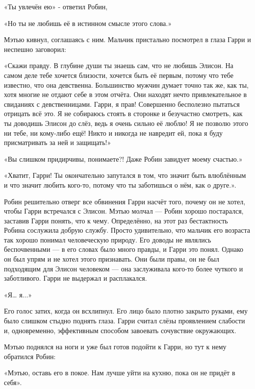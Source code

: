 \documentclass[a4paper,12pt]{book}
\begin{document}
\par
«Ты увлечён ею» - ответил Робин,
\par
«Но ты не любишь её в истинном смысле этого слова.»
\par
Мэтью кивнул, соглашаясь с ним. Мальчик пристально посмотрел в глаза Гарри и неспешно заговорил:
\par
«Скажи правду. В глубине души ты знаешь сам, что не любишь Элисон. На самом деле тебе хочется близости, хочется быть её первым, потому что тебе известно, что она девственна. Большинство мужчин думает точно так же, как ты, хотя многие не отдают себе в этом отчёта. Они находят нечто привлекательное в свиданиях с девственницами. Гарри, я прав! Совершенно бесполезно пытаться отрицать всё это. Я не собираюсь стоять в сторонке и безучастно смотреть, как ты доводишь Элисон до слёз, ведь я очень сильно её люблю! Я не позволю этого ни тебе, ни кому-либо ещё! Никто и никогда не навредит ей, пока я буду присматривать за ней и защищать!»
\par
«Вы слишком придирчивы, понимаете?! Даже Робин завидует моему счастью.»
\par
«Хватит, Гарри! Ты окончательно запутался в том, что значит быть влюблённым и что значит любить кого-то, потому что ты заботишься о нём, как о друге.».
\par
Робин решительно отверг все обвинения Гарри насчёт того, почему он не хотел, чтобы Гарри встречался с Элисон. Мэтью молчал — Робин хорошо постарался, заставив Гарри понять, что к чему. Определённо, на этот раз бестактность Робина сослужила добрую службу. Просто удивительно, что мальчик его возраста так хорошо понимал человеческую природу. Его доводы не являлись беспочвенными — в его словах было много правды, и Гарри это понял. Однако он был упрям и не хотел этого признавать. Они были правы, он не был подходящим для Элисон человеком — она заслуживала кого-то более чуткого и заботливого. Гарри не выдержал и расплакался.
\par
«Я… я...»
\par
Его голос затих, когда он всхлипнул. Его лицо было плотно закрыто руками, ему было слишком стыдно поднять глаза. Гарри считал слёзы проявлением слабости и, одновременно, эффективным способом завоевать сочувствие окружающих.
\par
Мэтью поднялся на ноги и уже был готов подойти к Гарри, но тут к нему обратился Робин:
\par
«Мэтью, оставь его в покое. Нам лучше уйти на кухню, пока он не придёт в себя».
\par
\end{document}
